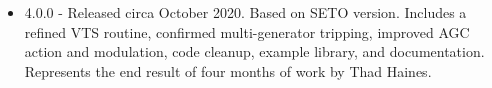 \begin{minipage}{.666\linewidth}
\begin{itemize}


 em
\item 4.0.0 - Released circa October 2020. Based on SETO version. 
Includes a refined VTS routine, confirmed multi-generator tripping, improved AGC action and modulation, code cleanup, example library, and documentation.
Represents the end result of four months of work by Thad Haines.
\end{itemize}
\end{minipage}%
